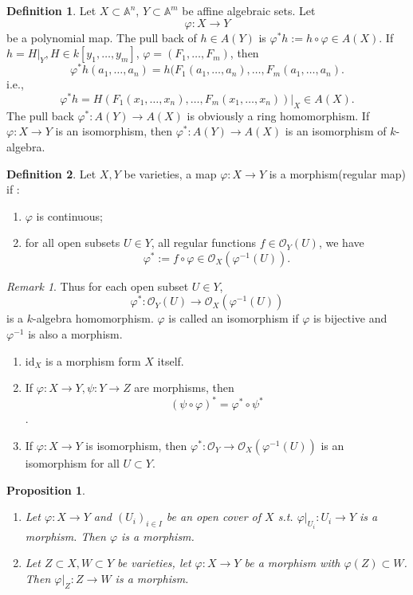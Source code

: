 \documentclass{amsart}
\theoremstyle{plain}
\newtheorem{proposition}{Proposition}
\theoremstyle{definition}
\newtheorem{definition}{Definition}
\theoremstyle{remark}
\newtheorem*{remark}{Remark}
\numberwithin{equation}{section}
\begin{document}
 \begin{definition}
 	Let $ X\subset \mathbb{A}^n $, $ Y\subset \mathbb{A}^m $ be affine algebraic sets. Let
 	$$
 	\varphi:X\to Y
 	$$
 	be a polynomial map.
 	The pull back of $ h\in A(Y) $ is $ \varphi^\ast h:=h\circ \varphi \in A(X) $. If $ h=H|_Y, H\in k[y_1,\dots,y_m] $, $ \varphi =(F_1,\dots,F_m) $, then
 	$$
 	\varphi^\ast h(a_1,\dots,a_n)=h(F_1(a_1,\dots,a_n),\dots, F_m(a_1,\dots,a_n ).
 	$$
 	i.e.,
 	$$
 	\varphi^\ast h = H( F_1(x_1,\dots,x_n),\dots, F_m(x_1,\dots,x_n) )|_X\in A(X).
 	$$
 	The pull back $ \varphi^\ast:A(Y)\to A(X) $ is obviously a ring homomorphism. If $ \varphi:X\to Y $ is an isomorphism, then $ \varphi^\ast:A(Y)\to A(X) $ is an isomorphism of $ k $-algebra.
 \end{definition}
 \begin{definition}\label{11}
 	Let $ X,Y $ be varieties, a map $ \varphi :X\to Y $ is a morphism(regular map) if :\begin{enumerate}
 		\item $ \varphi $ is continuous;
 		\item for all open subsets $ U\in Y $, all regular functions $ f\in \mathcal{O}_Y(U) $, we have
 		$$
 		\varphi^\ast := f\circ \varphi \in \mathcal{O}_X(\varphi^{-1}(U)).
 		$$
 	\end{enumerate}
 \end{definition}
 \begin{remark}
 	Thus for each open subset $ U\in Y $,
 	$$
 	\varphi^\ast :\mathcal{O}_Y(U)\to \mathcal{O}_X(\varphi^{-1}(U))
 	$$
 	is a $ k $-algebra homomorphism. $ \varphi $ is called an isomorphism if $ \varphi $ is bijective and $ \varphi^{-1} $ is also a morphism.
 	\begin{enumerate}
 		\item $ \text{id}_X $ is a morphism form $ X $ itself.
 		\item If $ \varphi:X\to Y,\psi :Y\to Z $ are morphisms, then
 		$$
 		(\psi\circ\varphi)^\ast = \varphi^\ast \circ \psi^\ast
 		$$.
 		\item If $ \varphi : X\to Y $ is isomorphism, then $ \varphi^\ast: \mathcal{O}_Y\to \mathcal{O}_X(\varphi^{-1}(U)) $ is an  isomorphism for all $ U\subset Y $.
 	\end{enumerate}
 \end{remark}
 \begin{proposition}
 	\begin{enumerate}
 		\item Let $ \varphi :X\to Y $ and $ (U_i)_{i\in I} $ be an open cover of $ X $ s.t. $ \varphi |_{U_i}:U_i\to Y $ is a morphism. Then $ \varphi  $ is a morphism.
 		\item Let $ Z\subset X, W\subset Y $ be varieties, let $ \varphi:X\to Y $ be a morphism with $ \varphi(Z)\subset W $. Then $ \varphi|_Z:Z\to W $ is a morphism.
 	\end{enumerate}
 \end{proposition}
\end{document}
